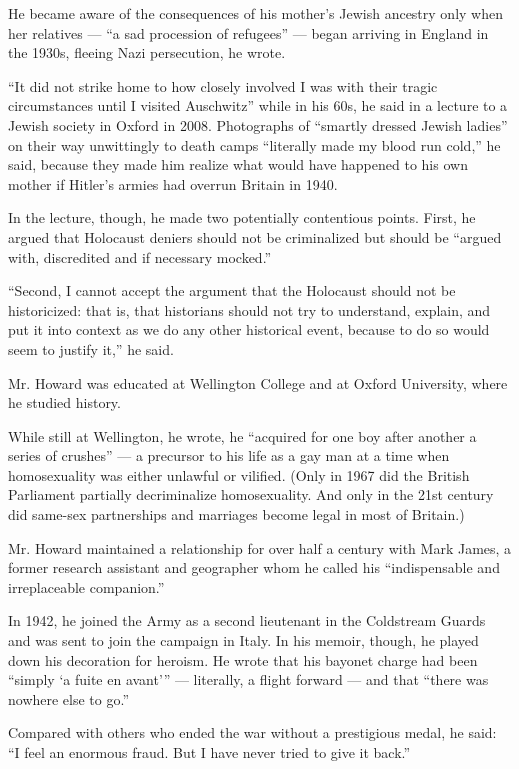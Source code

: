He became aware of the consequences of his mother's Jewish ancestry only
when her relatives --- ``a sad procession of refugees'' --- began
arriving in England in the 1930s, fleeing Nazi persecution, he wrote.

``It did not strike home to how closely involved I was with their tragic
circumstances until I visited Auschwitz'' while in his 60s, he said in a
lecture to a Jewish society in Oxford in 2008. Photographs of ``smartly
dressed Jewish ladies'' on their way unwittingly to death camps
``literally made my blood run cold,'' he said, because they made him
realize what would have happened to his own mother if Hitler's armies
had overrun Britain in 1940.

In the lecture, though, he made two potentially contentious points.
First, he argued that Holocaust deniers should not be criminalized but
should be ``argued with, discredited and if necessary mocked.''

``Second, I cannot accept the argument that the Holocaust should not be
historicized: that is, that historians should not try to understand,
explain, and put it into context as we do any other historical event,
because to do so would seem to justify it,'' he said.

Mr. Howard was educated at Wellington College and at Oxford University,
where he studied history.

While still at Wellington, he wrote, he ``acquired for one boy after
another a series of crushes'' --- a precursor to his life as a gay man
at a time when homosexuality was either unlawful or vilified. (Only in
1967 did the British Parliament partially decriminalize homosexuality.
And only in the 21st century did same-sex partnerships and marriages
become legal in most of Britain.)

Mr. Howard maintained a relationship for over half a century with Mark
James, a former research assistant and geographer whom he called his
``indispensable and irreplaceable companion.''

In 1942, he joined the Army as a second lieutenant in the Coldstream
Guards and was sent to join the campaign in Italy. In his memoir,
though, he played down his decoration for heroism. He wrote that his
bayonet charge had been ``simply `a fuite en avant''' --- literally, a
flight forward --- and that ``there was nowhere else to go.''

Compared with others who ended the war without a prestigious medal, he
said: ``I feel an enormous fraud. But I have never tried to give it
back.''

